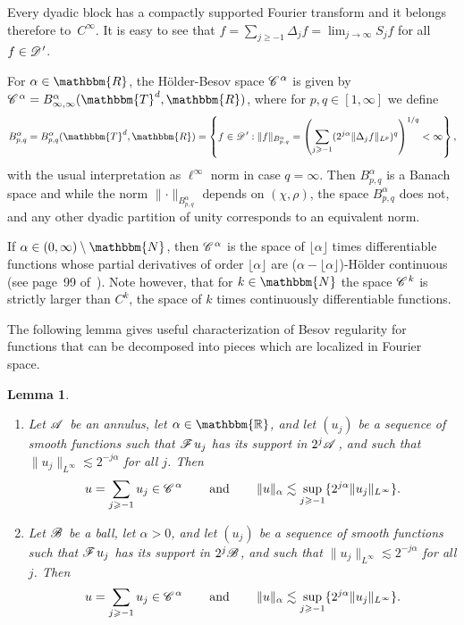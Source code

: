 \documentclass[11pt,reqno]{amsart}
\newcommand{\cdummy}{\cdot}
\newcommand{\tmdummy}{$\mbox{}$}
\newcommand{\tmop}[1]{\ensuremath{\operatorname{#1}}}
\newenvironment{enumeratenumeric}{\begin{enumerate}[1.] }{\end{enumerate}}
\newtheorem{lemma}[theorem]{Lemma}
\newcommand{\CC}{\mathscr{C} \hspace{.1em}}
\newcommand{\CD}{\mathscr{D} \hspace{.1em}}
\newcommand{\CF}{\mathscr{F} \hspace{.1em}}
\newcommand{\CB}{\mathscr{B} \hspace{.1em}}
\newcommand{\CA}{\mathscr{A} \hspace{.1em}}
\newcommand{\DD}{\mathscr{D} \hspace{.1em}}
\begin{document}
Every dyadic block has a compactly supported Fourier transform and it belongs
therefore to~$C^{\infty}$. It is easy to see that $f = \sum_{j \geqslant - 1}
\Delta_j f = \lim_{j \rightarrow \infty} S_j f$ for all $f \in \CD'$.

For $\alpha \in \mathbbm{R}$, the H{\"o}lder-Besov space $\CC^{\alpha}$ is
given by $\CC^{\alpha} = B^{\alpha}_{\infty, \infty} (\mathbbm{T}^d,
\mathbbm{R})$, where for $p, q \in [1, \infty]$ we define
\[ B^{\alpha}_{p, q} = B^{\alpha}_{p, q} (\mathbbm{T}^d, \mathbbm{R}) =
   \left\{ f \in \DD' : \|f\|_{B^{\alpha}_{p, q}} = \left( \sum_{j \geqslant -
   1} (2^{j \alpha} \| \Delta_j f\|_{L^p})^q \right)^{1 / q} < \infty
   \right\}, \]
with the usual interpretation as $\ell^{\infty}$ norm in case $q = \infty$.
Then $B^{\alpha}_{p, q}$ is a Banach space and while the norm $\lVert \cdummy
\rVert_{B^{\alpha}_{p, q}}$ depends on $(\chi, \rho)$, the space
$B^{\alpha}_{p, q}$ does not, and any other dyadic partition of unity
corresponds to an equivalent norm.

If $\alpha \in (0, \infty) \setminus \mathbbm{N}$, then $\CC^{\alpha}$ is the
space of $\lfloor \alpha \rfloor$ times differentiable functions whose partial
derivatives of order $\lfloor \alpha \rfloor$ are ($\alpha - \lfloor \alpha
\rfloor$)-H{\"o}lder continuous (see page~99
of~{\cite{bahouri_fourier_2011}}). Note however, that for $k \in \mathbbm{N}$
the space $\CC^k$ is strictly larger than $C^k$, the space of $k$ times
continuously differentiable functions.

The following lemma gives useful characterization of Besov regularity for
functions that can be decomposed into pieces which are localized in Fourier
space.

\begin{lemma}
  \label{lem: Besov regularity of series}{\tmdummy}
  
  \begin{enumeratenumeric}
    \item Let $\CA$ be an annulus, let $\alpha \in \mathbb{\mathbbm{R}}$, and
    let $(u_j)$ be a sequence of smooth functions such that $\CF u_j$ has its
    support in $2^j \CA$, and such that $\|u_j \|_{L^{\infty}} \lesssim 2^{- j
    \alpha}$ for all $j$. Then
    \[ u = \sum_{j \geqslant - 1} u_j \in \CC^{\alpha} \qquad \tmop{and}
       \qquad \|u\|_{\alpha} \lesssim \sup_{j \geqslant - 1} \{2^{j \alpha}
       \|u_j \|_{L^{\infty}} \} . \]
    \item Let $\CB$ be a ball, let $\alpha > 0$, and let $(u_j)$ be a sequence
    of smooth functions such that $\CF u_j$ has its support in $2^j \CB$, and
    such that $\|u_j \|_{L^{\infty}} \lesssim 2^{- j \alpha}$ for all $j$.
    Then
    \[ u = \sum_{j \geqslant - 1} u_j \in \CC^{\alpha} \qquad \tmop{and}
       \qquad \|u\|_{\alpha} \lesssim \sup_{j \geqslant - 1} \{2^{j \alpha}
       \|u_j \|_{L^{\infty}} \} . \]
  \end{enumeratenumeric}
\end{lemma}
\end{document}
